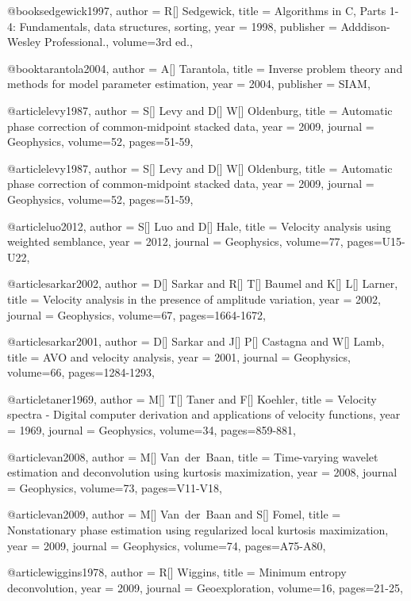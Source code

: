 {@book{sedgewick1997,
  author =	 {R[] Sedgewick},
  title =	 {Algorithms in C, Parts 1-4: Fundamentals, data structures, sorting},
  year =	 1998,
  publisher =	 { Adddison-Wesley Professional.},
  volume={3rd ed.},
}

@book{tarantola2004,
  author =	 {A[] Tarantola},
  title =	 {Inverse problem theory and methods for model parameter estimation},
  year =	 2004,
  publisher =	 { SIAM},
}

@article{levy1987,
  author =	 {S[] Levy and D[] W[] Oldenburg},
  title =	 {Automatic phase correction of common-midpoint stacked data},
  year =	 2009,
  journal =	 {Geophysics},
  volume={52},
 pages=51-59,
}

@article{levy1987,
  author =	 {S[] Levy and D[] W[] Oldenburg},
  title =	 {Automatic phase correction of common-midpoint stacked data},
  year =	 2009,
  journal =	 {Geophysics},
  volume={52},
 pages=51-59,
}

@article{luo2012,
  author =	 {S[] Luo and D[] Hale},
  title =	 {Velocity analysis using weighted semblance},
  year =	 2012,
  journal =	 {Geophysics},
  volume={77},
 pages=U15-U22,
}

@article{sarkar2002,
  author =	 {D[] Sarkar and R[] T[] Baumel and K[] L[] Larner},
  title =	 {Velocity analysis in the presence of amplitude variation},
  year =	 2002,
  journal =	 {Geophysics},
  volume={67},
  pages=1664-1672,
}

@article{sarkar2001,
  author =	 {D[] Sarkar and J[] P[] Castagna and W[] Lamb},
  title =	 {AVO and velocity analysis},
  year =	 2001,
  journal =	 {Geophysics},
  volume={66},
 pages=1284-1293,
}

@article{taner1969,
  author =	 {M[] T[] Taner and F[] Koehler},
  title =	 {Velocity spectra - Digital computer derivation and applications of velocity functions},
  year =	 1969,
  journal =	 {Geophysics},
  volume={34},
 pages=859-881,
}

@article{van2008,
  author =	 {M[] Van~der~Baan},
  title =	 {Time-varying wavelet estimation and deconvolution using kurtosis maximization},
  year =	 2008,
  journal =	 {Geophysics},
  volume={73},
 pages=V11-V18,
}

@article{van2009,
  author =	 {M[] Van~der~Baan and S[] Fomel},
  title =	 {Nonstationary phase estimation using regularized local kurtosis maximization},
  year =	 2009,
  journal =	 {Geophysics},
  volume={74},
 pages=A75-A80,
}

@article{wiggins1978,
  author =	 {R[] Wiggins},
  title =	 {Minimum entropy deconvolution},
  year =	 2009,
  journal =	 {Geoexploration},
  volume={16},
 pages=21-25,
}

}
